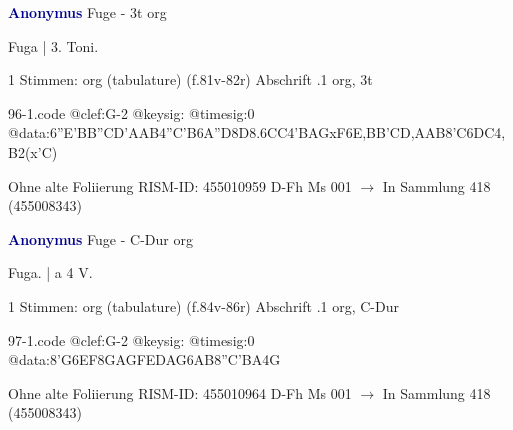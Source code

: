 \documentclass[twocolumn]{book}
\begin{document}
\newline \par \vspace{7pt} \textcolor{darkblue}{\textbf{Anonymus  }}
\newline Fuge - 3t
\newline org
\newline \begin{itshape}[f.81v, at left:] Fuga | 3. Toni.\end{itshape} 
\newline \textcolor{darkblue}{}  1 Stimmen: org (tabulature)  (f.81v-82r)
\newline Abschrift
.1  org, 3t  
\begin{filecontents*}{96-1.code}
@clef:G-2
@keysig:
@timesig:0
@data:{6''E'BB''C}{D'AAB}4''C'B{6A''D}8D{8.6CC}4'BAGxF{6E,BB'C}{D,AAB}8'C{6DC}4,B2(x'C)
\end{filecontents*}
\newline
%
\newline Ohne alte Foliierung
\newline RISM-ID: 455010959
\newline D-Fh  Ms 001
\newline $\rightarrow$ In Sammlung 418 (455008343)
      
\newline \par \vspace{7pt} \textcolor{darkblue}{\textbf{Anonymus  }}
\newline Fuge - C-Dur
\newline org
\newline \begin{itshape}[f.84v, at left:] Fuga. | a 4 V.\end{itshape} 
\newline \textcolor{darkblue}{}  1 Stimmen: org (tabulature)  (f.84v-86r)
\newline Abschrift
.1  org, C-Dur  
\begin{filecontents*}{97-1.code}
@clef:G-2
@keysig:
@timesig:0
@data:{8'G6EF8GA}{GFED}{AG6AB8''C}{'BA}4G
\end{filecontents*}
\newline
%
\newline Ohne alte Foliierung
\newline RISM-ID: 455010964
\newline D-Fh  Ms 001
\newline $\rightarrow$ In Sammlung 418 (455008343)
      
\end{document}
